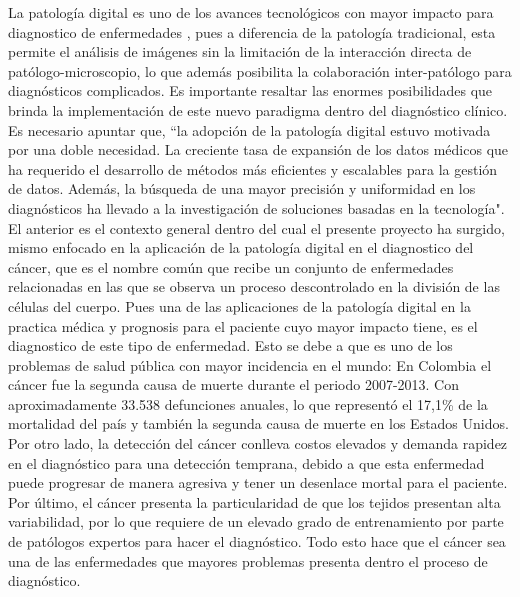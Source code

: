 \documentclass[12pt,letterpaper,final, openany]{scrbook}
\begin{document}
La patología digital es uno de los avances tecnológicos con mayor impacto para diagnostico de enfermedades \cite{pallua_future_2020}, pues a diferencia de la patología tradicional, esta permite el análisis de imágenes sin la limitación de la interacción directa de patólogo-microscopio, lo que además posibilita la colaboración inter-patólogo para diagnósticos complicados. Es importante resaltar las enormes posibilidades que brinda la implementación de este nuevo paradigma dentro del diagnóstico clínico. Es necesario apuntar que, ``la adopción de la patología digital estuvo motivada por una doble necesidad. La creciente tasa de expansión de los datos médicos que ha requerido el desarrollo de métodos más eficientes y escalables para la gestión de datos. Además, la búsqueda de una mayor precisión y uniformidad en los diagnósticos ha llevado a la investigación de soluciones basadas en la tecnología"\cite{kiran_digital_nodate}. El anterior es el contexto general dentro del cual el presente proyecto ha surgido, mismo enfocado en la aplicación de la patología digital en el diagnostico del cáncer, que es el nombre común que recibe un conjunto de enfermedades relacionadas en las que se observa un proceso descontrolado en la división de las células del cuerpo. Pues una de las aplicaciones de la patología digital en la practica médica y prognosis para el paciente cuyo mayor impacto tiene, es el diagnostico de este tipo de enfermedad. Esto se debe a que es uno de los problemas de salud pública con mayor incidencia en el mundo: En Colombia el cáncer fue la segunda causa de muerte durante el periodo 2007-2013. Con aproximadamente 33.538 defunciones anuales, lo que representó el  17,1\% de la mortalidad del país \cite{pardo_c_atlas_2017} y también la segunda causa de muerte en los Estados Unidos\cite{sung_global_2021}. Por otro lado, la detección del cáncer conlleva costos elevados y demanda rapidez en el diagnóstico para una detección temprana, debido a que esta enfermedad puede progresar de manera agresiva y tener un desenlace mortal para el paciente. Por último, el cáncer presenta la particularidad de que los tejidos presentan alta variabilidad, por lo que requiere de un elevado grado de entrenamiento por parte de patólogos expertos para hacer el diagnóstico. Todo esto hace que el cáncer sea una de las enfermedades que mayores problemas presenta dentro el proceso de diagnóstico.
\end{document}
